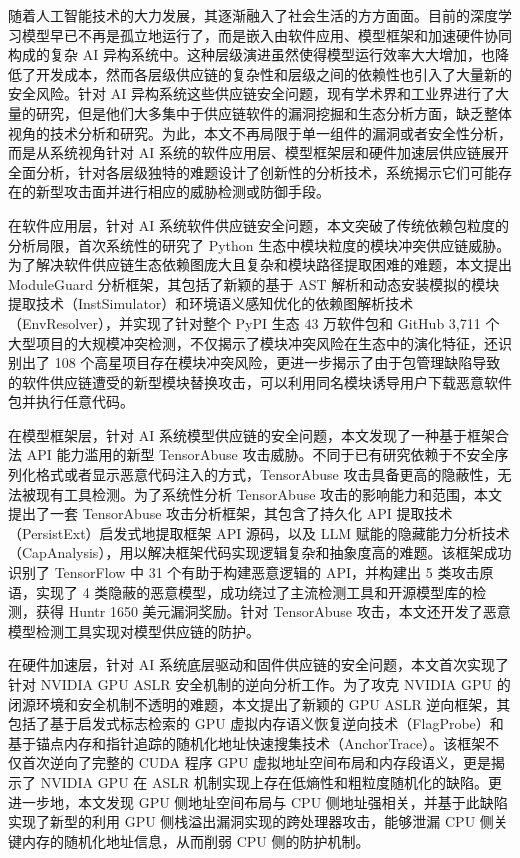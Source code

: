 \cleardoublepage
{}
随着人工智能技术的大力发展，其逐渐融入了社会生活的方方面面。目前的深度学习模型早已不再是孤立地运行了，而是嵌入由软件应用、模型框架和加速硬件协同构成的复杂 AI 异构系统中。这种层级演进虽然使得模型运行效率大大增加，也降低了开发成本，然而各层级供应链的复杂性和层级之间的依赖性也引入了大量新的安全风险。针对 AI 异构系统这些供应链安全问题，现有学术界和工业界进行了大量的研究，但是他们大多集中于供应链软件的漏洞挖掘和生态分析方面，缺乏整体视角的技术分析和研究。为此，本文不再局限于单一组件的漏洞或者安全性分析，而是从系统视角针对 AI 系统的软件应用层、模型框架层和硬件加速层供应链展开全面分析，针对各层级独特的难题设计了创新性的分析技术，系统揭示它们可能存在的新型攻击面并进行相应的威胁检测或防御手段。

在软件应用层，针对 AI 系统软件供应链安全问题，本文突破了传统依赖包粒度的分析局限，首次系统性的研究了 Python 生态中模块粒度的模块冲突供应链威胁。为了解决软件供应链生态依赖图庞大且复杂和模块路径提取困难的难题，本文提出 ModuleGuard 分析框架，其包括了新颖的基于 AST 解析和动态安装模拟的模块提取技术（InstSimulator）和环境语义感知优化的依赖图解析技术（EnvResolver），并实现了针对整个 PyPI 生态 43 万软件包和 GitHub 3,711 个大型项目的大规模冲突检测，不仅揭示了模块冲突风险在生态中的演化特征，还识别出了 108 个高星项目存在模块冲突风险，更进一步揭示了由于包管理缺陷导致的软件供应链遭受的新型模块替换攻击，可以利用同名模块诱导用户下载恶意软件包并执行任意代码。

在模型框架层，针对 AI 系统模型供应链的安全问题，本文发现了一种基于框架合法 API 能力滥用的新型 TensorAbuse 攻击威胁。不同于已有研究依赖于不安全序列化格式或者显示恶意代码注入的方式，TensorAbuse 攻击具备更高的隐蔽性，无法被现有工具检测。为了系统性分析 TensorAbuse 攻击的影响能力和范围，本文提出了一套 TensorAbuse 攻击分析框架，其包含了持久化 API 提取技术（PersistExt）启发式地提取框架 API 源码，以及 LLM 赋能的隐藏能力分析技术（CapAnalysis），用以解决框架代码实现逻辑复杂和抽象度高的难题。该框架成功识别了 TensorFlow 中 31 个有助于构建恶意逻辑的 API，并构建出 5 类攻击原语，实现了 4 类隐蔽的恶意模型，成功绕过了主流检测工具和开源模型库的检测，获得 Huntr 1650 美元漏洞奖励。针对 TensorAbuse 攻击，本文还开发了恶意模型检测工具实现对模型供应链的防护。

在硬件加速层，针对 AI 系统底层驱动和固件供应链的安全问题，本文首次实现了针对 NVIDIA GPU ASLR 安全机制的逆向分析工作。为了攻克 NVIDIA GPU 的闭源环境和安全机制不透明的难题，本文提出了新颖的 GPU ASLR 逆向框架，其包括了基于启发式标志检索的 GPU 虚拟内存语义恢复逆向技术（FlagProbe）和基于锚点内存和指针追踪的随机化地址快速搜集技术（AnchorTrace）。该框架不仅首次逆向了完整的 CUDA 程序 GPU 虚拟地址空间布局和内存段语义，更是揭示了 NVIDIA GPU 在 ASLR 机制实现上存在低熵性和粗粒度随机化的缺陷。更进一步地，本文发现 GPU 侧地址空间布局与 CPU 侧地址强相关，并基于此缺陷实现了新型的利用 GPU 侧栈溢出漏洞实现的跨处理器攻击，能够泄漏 CPU 侧关键内存的随机化地址信息，从而削弱 CPU 侧的防护机制。

